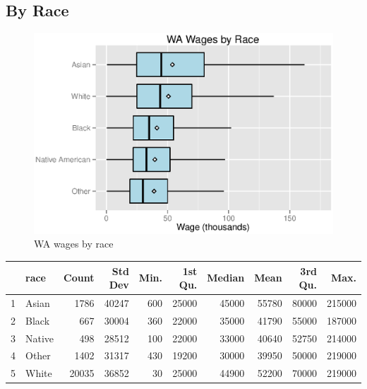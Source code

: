\documentclass{exam}
\begin{document}
  \subsection{By Race}
  \begin{figure}[H]
    \centering
    \includegraphics{figures/wa_wage_by_race.eps}
    \caption{WA wages by race}
  \end{figure}

  \begin{table}[ht]
    \centering
    \begin{tabular}{rlrrrrrrrr}
      \toprule
          & race   & Count & Std Dev & Min. & 1st Qu. & Median & Mean  & 3rd Qu. & Max. \\
      \midrule
        1 & Asian  & 1786  & 40247   & 600  & 25000   & 45000  & 55780 & 80000   & 215000 \\
        2 & Black  & 667   & 30004   & 360  & 22000   & 35000  & 41790 & 55000   & 187000 \\
        3 & Native & 498   & 28512   & 100  & 22000   & 33000  & 40640 & 52750   & 214000 \\
        4 & Other  & 1402  & 31317   & 430  & 19200   & 30000  & 39950 & 50000   & 219000 \\
        5 & White  & 20035 & 36852   & 30   & 25000   & 44900  & 52200 & 70000   & 219000 \\
      \bottomrule
    \end{tabular}
  \end{table}
\end{document}
